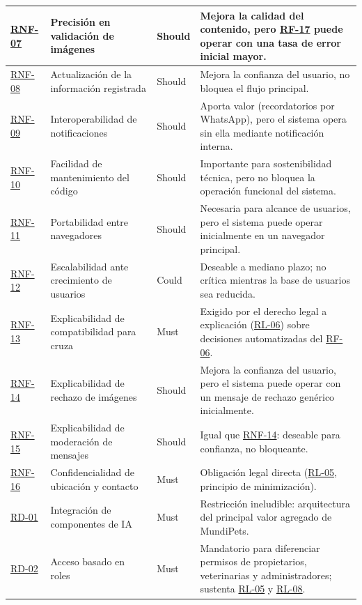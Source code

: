 \documentclass[journal,onecolumn]{IEEEtran}
\begin{document}
\begin{longtable}{@{}p{1.6cm} p{4.8cm} p{1.6cm} p{5.2cm}@{}}
		\hline
		\hyperref[tab:RNF-07]{RNF-07} & Precisión en validación de imágenes & Should & Mejora la calidad del contenido, pero \hyperref[tab:RF-17]{RF-17} puede operar con una tasa de error inicial mayor. \\
		\hline
		\hyperref[tab:RNF-08]{RNF-08} & Actualización de la información registrada & Should & Mejora la confianza del usuario, no bloquea el flujo principal. \\
		\hline
		\hyperref[tab:RNF-09]{RNF-09} & Interoperabilidad de notificaciones & Should & Aporta valor (recordatorios por WhatsApp), pero el sistema opera sin ella mediante notificación interna. \\
		\hline
		\hyperref[tab:RNF-10]{RNF-10} & Facilidad de mantenimiento del código & Should & Importante para sostenibilidad técnica, pero no bloquea la operación funcional del sistema. \\
		\hline
		\hyperref[tab:RNF-11]{RNF-11} & Portabilidad entre navegadores & Should & Necesaria para alcance de usuarios, pero el sistema puede operar inicialmente en un navegador principal. \\
		\hline
		\hyperref[tab:RNF-12]{RNF-12} & Escalabilidad ante crecimiento de usuarios & Could & Deseable a mediano plazo; no crítica mientras la base de usuarios sea reducida. \\
		\hline
		\hyperref[tab:RNF-13]{RNF-13} & Explicabilidad de compatibilidad para cruza & Must & Exigido por el derecho legal a explicación (\hyperref[rl:06]{RL-06}) sobre decisiones automatizadas del \hyperref[tab:RF-06]{RF-06}. \\
		\hline
		\hyperref[tab:RNF-14]{RNF-14} & Explicabilidad de rechazo de imágenes & Should & Mejora la confianza del usuario, pero el sistema puede operar con un mensaje de rechazo genérico inicialmente. \\
		\hline
		\hyperref[tab:RNF-15]{RNF-15} & Explicabilidad de moderación de mensajes & Should & Igual que \hyperref[tab:RNF-14]{RNF-14}: deseable para confianza, no bloqueante. \\
		\hline
		\hyperref[tab:RNF-16]{RNF-16} & Confidencialidad de ubicación y contacto & Must & Obligación legal directa (\hyperref[rl:05]{RL-05}, principio de minimización). \\
		\hline
		\hyperref[tab:RD-01]{RD-01} & Integración de componentes de IA & Must & Restricción ineludible: arquitectura del principal valor agregado de MundiPets. \\
		\hline
		\hyperref[tab:RD-02]{RD-02} & Acceso basado en roles & Must & Mandatorio para diferenciar permisos de propietarios, veterinarias y administradores; sustenta \hyperref[rl:05]{RL-05} y \hyperref[rl:08]{RL-08}. \\

\end{longtable}
\end{document}
